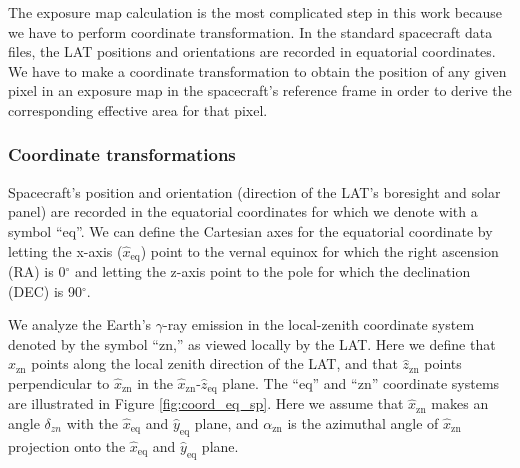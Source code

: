 The exposure map calculation is the most complicated step in
this work because we have to perform coordinate transformation.
In the standard spacecraft data files, the LAT positions and
orientations are recorded in equatorial coordinates.
We have to make a coordinate transformation to obtain the
position of any given pixel in an exposure map in the
spacecraft's reference frame in order to derive the
corresponding effective area for that pixel.

\subsubsection{Coordinate transformations}

Spacecraft's position and orientation (direction of the
LAT's boresight and solar panel) are recorded in the equatorial
coordinates for which we denote with a symbol ``eq''. We can define
the Cartesian axes for the equatorial coordinate by letting the
x-axis ($\hat{x}_\text{eq}$) point to the vernal equinox for which the right
ascension (RA) is 0$^\circ$ and letting the z-axis point to the
pole for which the declination (DEC) is 90$^\circ$.

We analyze the Earth's $\gamma$-ray emission in the local-zenith
coordinate system denoted by the symbol ``zn,'' as viewed locally
by the LAT.  Here we define that $\hat{x}_\text{zn}$
points along the local
zenith direction of the LAT, and that $\hat{z}_\text{zn}$
points perpendicular
to $\hat{x}_\text{zn}$ in the $\hat{x}_\text{zn}$-$\hat{z}_\text{eq}$
plane. The ``eq'' and ``zn''
coordinate systems are illustrated in Figure \ref{fig:coord_eq_sp}.
Here we assume that $\hat{x}_\text{zn}$ makes an angle 
$\delta_{zn}$ with
the $\hat{x}_\text{eq}$ and $\hat{y}_\text{eq}$ plane,
and $\alpha_\text{zn}$ is the azimuthal
angle of $\hat{x}_\text{zn}$ projection onto
the $\hat{x}_\text{eq}$ and $\hat{y}_\text{eq}$ plane.

